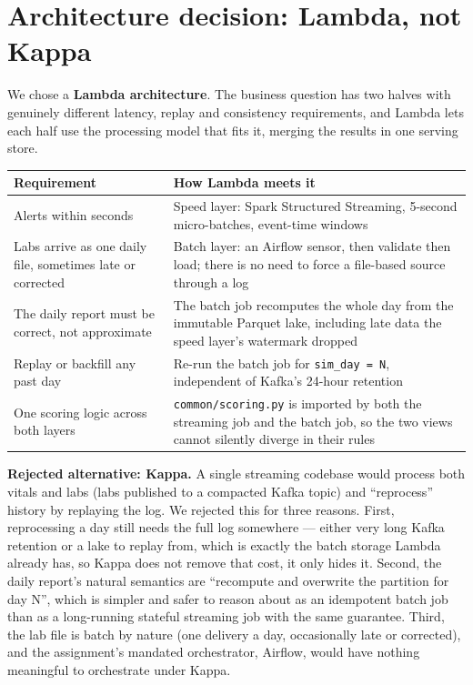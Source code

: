 \documentclass[11pt,a4paper]{article}
\newcommand{\code}[1]{\texttt{\small #1}}
\begin{document}
\section{Architecture decision: Lambda, not Kappa}
\label{sec:architecture}

We chose a \textbf{Lambda architecture}. The business question has two halves with genuinely
different latency, replay and consistency requirements, and Lambda lets each half use the
processing model that fits it, merging the results in one serving store.

\begin{longtable}{@{}L{5.5cm}L{9.2cm}@{}}
\toprule
\textbf{Requirement} & \textbf{How Lambda meets it} \\
\midrule
\endhead
Alerts within seconds & Speed layer: Spark Structured Streaming, 5-second micro-batches, event-time windows \\
Labs arrive as one daily file, sometimes late or corrected & Batch layer: an Airflow sensor, then validate then load; there is no need to force a file-based source through a log \\
The daily report must be correct, not approximate & The batch job recomputes the whole day from the immutable Parquet lake, including late data the speed layer's watermark dropped \\
Replay or backfill any past day & Re-run the batch job for \code{sim\_day = N}, independent of Kafka's 24-hour retention \\
One scoring logic across both layers & \code{common/scoring.py} is imported by both the streaming job and the batch job, so the two views cannot silently diverge in their rules \\
\bottomrule
\end{longtable}

\textbf{Rejected alternative: Kappa.} A single streaming codebase would process both vitals and
labs (labs published to a compacted Kafka topic) and ``reprocess'' history by replaying the log. We
rejected this for three reasons. First, reprocessing a day still needs the full log somewhere ---
either very long Kafka retention or a lake to replay from, which is exactly the batch storage Lambda
already has, so Kappa does not remove that cost, it only hides it. Second, the daily report's natural
semantics are ``recompute and overwrite the partition for day N'', which is simpler and safer to
reason about as an idempotent batch job than as a long-running stateful streaming job with the same
guarantee. Third, the lab file is batch by nature (one delivery a day, occasionally late or
corrected), and the assignment's mandated orchestrator, Airflow, would have nothing meaningful to
orchestrate under Kappa.
\end{document}
